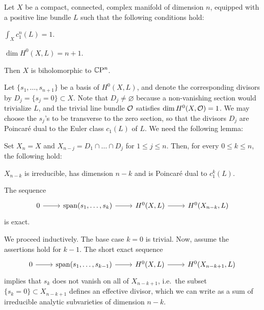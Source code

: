 \begin{thm}\label{thm:KOCPn}
	Let $X$ be a compact, connected, complex manifold of dimension $n$, equipped with a positive line bundle $L$ such that the following conditions hold:
	\begin{numberedlist}
		\item $\displaystyle\int_X c_1^n(L)=1$.
		\item $\dim H^0(X,L)=n+1$.
	\end{numberedlist}
	Then $X$ is biholomorphic to $\mathbb{C}\mathrm{P}^n$.
\end{thm}
\begin{myproof}
	Let $\{s_1,\dots,s_{n+1}\}$ be a basis of $H^0(X,L)$, and denote the corresponding divisors by $D_j=\{s_j=0\}\subset X$. Note that $D_j\neq \varnothing$ because a non-vanishing section would trivialize $L$, and the trivial line bundle $\mathcal{O}$ satisfies $\dim H^0(X,\mathcal{O})=1$. We may choose the $s_j$'s to be transverse to the zero section, so that the divisors $D_j$ are Poincar\'e dual to the Euler class $c_1(L)$ of $L$. We need the following lemma: 
	
	\begin{lem}\label{lem:KOCPn}
		Set $X_n=X$ and $X_{n-j}=D_1\cap\dots \cap D_j$ for $1\leq j\leq n$. Then, for every $0\leq k\leq n$, the following hold:
		\begin{numberedlist}
			\item $X_{n-k}$ is irreducible, has dimension $n-k$ and is Poincar\'e dual to $c_1^k(L)$.
			\item The sequence 
			\begin{equation*}
				\begin{tikzcd}
					0 \ar[r] & \Span(s_1,\dots,s_k) \ar[r] 
					& H^0(X,L) \ar[r] & H^0(X_{n-k},L) 
				\end{tikzcd}
			\end{equation*}
			is exact.
		\end{numberedlist}
	\end{lem}
	\begin{myproof}
		We proceed inductively. The base case $k=0$ is trivial. Now, assume the assertions hold for $k-1$. The short exact sequence
		\begin{equation*}
			\begin{tikzcd}
				0 \ar[r] & \Span(s_1,\dots,s_{k-1}) \ar[r] & H^0(X,L) \ar[r] & H^0(X_{n-k+1},L)
			\end{tikzcd}
		\end{equation*}
		implies that $s_k$ does not vanish on all of $X_{n-k+1}$, i.e.~the subset $\{s_k=0\}\subset X_{n-k+1}$ defines an effective divisor, which we can write as a sum of irreducible analytic subvarieties of dimension $n-k$. 
		

\end{myproof}
\end{myproof}
